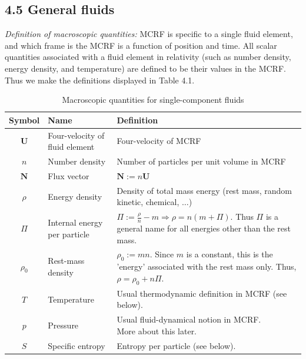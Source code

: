 \documentclass[12pt]{book}
\begin{document}
    \subsection{4.5 General fluids}

    \textit{Definition of macroscopic quantities:}
    MCRF is specific to a single fluid element, and which frame is the MCRF is a function of position and time. All scalar quantities associated with a fluid element in relativity (such as number density, energy density, and temperature) are defined to be their values in the MCRF. Thus we make the definitions displayed in Table 4.1.

    \begin{table}[h]
    \centering
    \begin{tabular}{|c|l|l|}
    \hline
    \textbf{Symbol} & \textbf{Name} & \textbf{Definition} \\ \hline
    \(\mathbf{U}\) & \footnotesize Four-velocity of fluid element &\footnotesize Four-velocity of MCRF\par \\ \hline
    \(n\) & \footnotesize Number density &\footnotesize Number of particles per unit volume in MCRF \par \\ \hline
    \(\mathbf{N}\) &\footnotesize Flux vector &\footnotesize \(\mathbf{N} := n\mathbf{U}\) \\ \hline
    \(\rho\) &\footnotesize Energy density & \thead{\footnotesize Density of total mass energy \\(rest mass, random kinetic, chemical, $\dots$)}\\ \hline
    \(\Pi\) &\footnotesize Internal energy per particle &\thead{\footnotesize \(\Pi := \frac{\rho}{n} - m \Rightarrow \rho = n(m + \Pi)\). \\ Thus \(\Pi\) is a general name for all energies \\other than the rest mass.}\\ \hline
    \(\rho_0\) &\footnotesize Rest-mass density &\thead{\footnotesize \(\rho_0 := mn\). Since \(m\) is a constant,\\ this is the 'energy' associated with the rest mass only. \\Thus, \(\rho = \rho_0 + n\Pi\).}\\ \hline
    \(T\) &\footnotesize Temperature &\footnotesize Usual thermodynamic definition in MCRF (see below). \\ \hline
    \(p\) &\footnotesize Pressure & \thead{\footnotesize Usual fluid-dynamical notion in MCRF. \\More about this later.} \\ \hline
    \(S\) &\footnotesize Specific entropy &\footnotesize Entropy per particle (see below). \\ \hline
    \end{tabular}
    \caption{Macroscopic quantities for single-component fluids}
    \label{table 4.1}
    \end{table}
\end{document}
